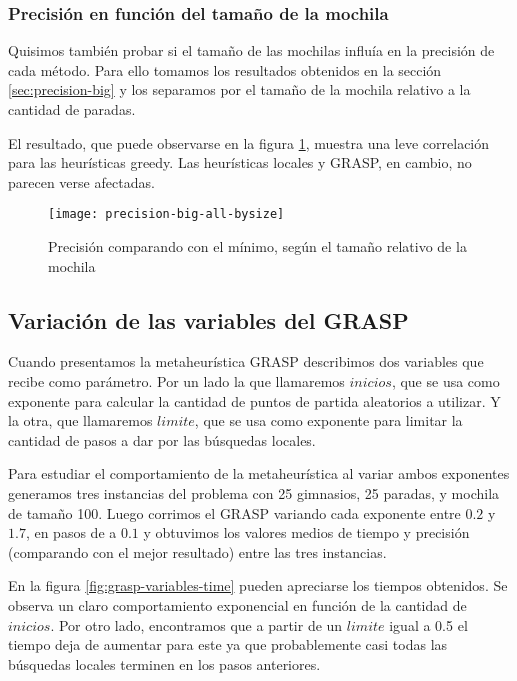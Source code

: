 \subsubsection{Precisión en función del tamaño de la mochila}

Quisimos también probar si el tamaño de las mochilas influía en la precisión de cada método.
Para ello tomamos los resultados obtenidos en la sección \ref{sec:precision-big} y los separamos
por el tamaño de la mochila relativo a la cantidad de paradas.

El resultado, que puede observarse en la figura \ref{fig:precision-big-all-bysize},
muestra una leve correlación para las heurísticas greedy. Las heurísticas locales y GRASP, en cambio, no parecen verse afectadas.

\begin{figure}[H]
    \centering
    \texttt{[image: precision-big-all-bysize]}
    \caption{Precisión comparando con el mínimo, según el tamaño relativo de la mochila}
    \label{fig:precision-big-all-bysize}
\end{figure}

\subsection{Variación de las variables del GRASP}

Cuando presentamos la metaheurística GRASP describimos dos variables que recibe como parámetro.
Por un lado la que llamaremos $inicios$, que se usa como exponente para calcular la cantidad de puntos de partida aleatorios a utilizar.
Y la otra, que llamaremos $limite$, que se usa como exponente para limitar la cantidad de pasos a dar por las búsquedas locales.

Para estudiar el comportamiento de la metaheurística al variar ambos exponentes generamos tres instancias del problema con 25 gimnasios,
25 paradas, y mochila de tamaño 100. Luego corrimos el GRASP variando cada exponente entre $0.2$ y $1.7$, en pasos de a $0.1$ y obtuvimos
los valores medios de tiempo y precisión (comparando con el mejor resultado) entre las tres instancias.

En la figura \ref{fig:grasp-variables-time} pueden apreciarse los tiempos obtenidos.
Se observa un claro comportamiento exponencial en función de la cantidad de $inicios$.
Por otro lado, encontramos que a partir de un $limite$ igual a 0.5 el tiempo deja de aumentar para este ya que
probablemente casi todas las búsquedas locales terminen en los pasos anteriores.

